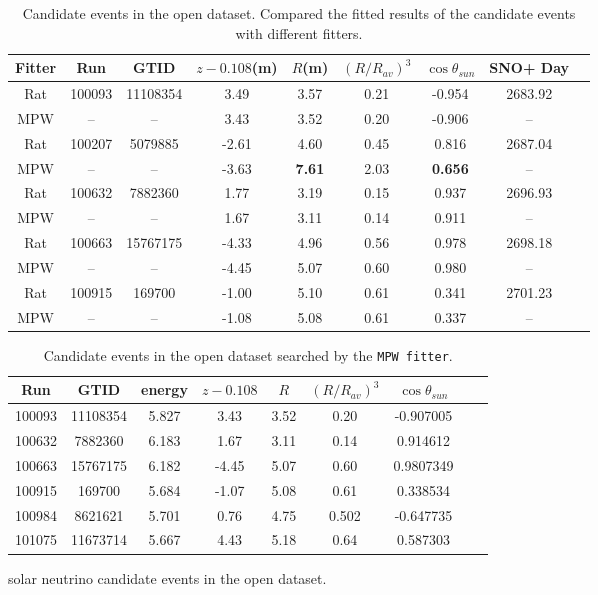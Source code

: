 \begin{table}[ht]
	\centering
	\caption[Candidate events in the open dataset.]{Candidate events in the open dataset. Compared the fitted results of the candidate events with different fitters.}
	\label{opendata}
	\begin{tabular*}{150mm}{c@{\extracolsep{\fill}}cccccccc}
		\toprule
		Fitter &	Run &  GTID &  $z-0.108$(m) & $R$(m)& $(R/R_{av})^3$ & $\cos\theta_{sun}$ & SNO+ Day\\
		\hline 
		Rat & 100093 &11108354 &3.49 &3.57 &0.21 &-0.954 &2683.92 \\	
		MPW &  --& --& 3.43 &	3.52 &	0.20	& -0.906 & --\\
		Rat &	100207 &5079885 &-2.61 &4.60 &0.45 &0.816 &2687.04\\
		MPW &	 --& --& -3.63 & \textbf{7.61} &	2.03 & \textbf{0.656} & -- \\
		Rat &100632 &7882360 &1.77 &3.19 &0.15 &0.937 &2696.93\\
		MPW &    --& --&  1.67 & 3.11 &	0.14 & 0.911 & -- \\
		Rat &100663 &15767175 &-4.33& 4.96 &0.56 &0.978 &2698.18\\
		MPW & --& -- &-4.45 &	5.07 &	0.60 &	0.980 & -- \\
		Rat &100915 &169700 &-1.00 &5.10 &0.61 &0.341 &2701.23\\
		MPW &	--& --& -1.08 &	5.08 &	0.61 &	0.337 & -- \\	
		\bottomrule
	\end{tabular*}
\end{table}

\begin{table}[ht]
	\centering
	\caption{Candidate events in the open dataset searched by the \texttt{MPW fitter}.}
	\label{opendataMPW}
	\begin{tabular*}{150mm}{c@{\extracolsep{\fill}}cccccccc}
		\toprule
		Run & GTID & energy & $z-0.108$ & $R$ & $(R/R_{av})^3$ & $\cos\theta_{sun}$\\
		\hline 
		100093 &	11108354	&5.827 & 3.43 & 3.52 & 0.20 & -0.907005\\
		100632&	7882360    &6.183& 1.67 &3.11 &0.14 &0.914612\\
		100663&	15767175   &	6.182 & -4.45 &5.07 &0.60&	0.9807349\\
		100915&	169700   &	5.684 &	-1.07 &5.08 &0.61&0.338534\\
		100984&	8621621&	5.701 & 0.76 &4.75 &0.502&-0.647735\\
		101075&	11673714&	5.667 &4.43 &5.18 &0.64& 0.587303\\
		
		\bottomrule
	\end{tabular*}
\end{table}
solar neutrino candidate events in the open dataset.

